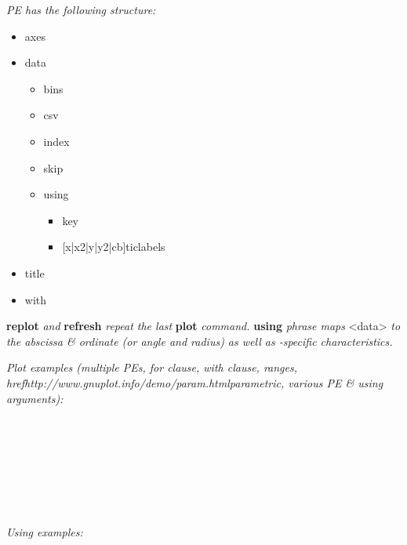 \textit{PE has the following structure:}\\
\begin{itemize}[label=|]
\item axes
\item data
    \begin{itemize}
	\item bins
	\item csv
	\item index
	\item skip
	\item using
	    \begin{itemize}
		\item key
		\item {[x|x2|y|y2|cb]}ticlabels
	    \end{itemize}
    \end{itemize}
\item title
\item with
\end{itemize}


\textbf{replot} \textit{ and }\textbf{refresh}\textit{ repeat the last }\textbf{plot}\textit{ command. }\textbf{using}\textit{ phrase maps }<data>\textit{ to the abscissa \& ordinate (or angle and radius) as well as -specific characteristics.}


\textit{Plot examples (multiple PEs, for clause, with clause, ranges, href{http://www.gnuplot.info/demo/param.html}{parametric}, various PE \& using arguments):}\\
\\
\\
\\
\\
\\
\\
\\

\textit{Using examples:}\\

\\
\\
\\
\\



